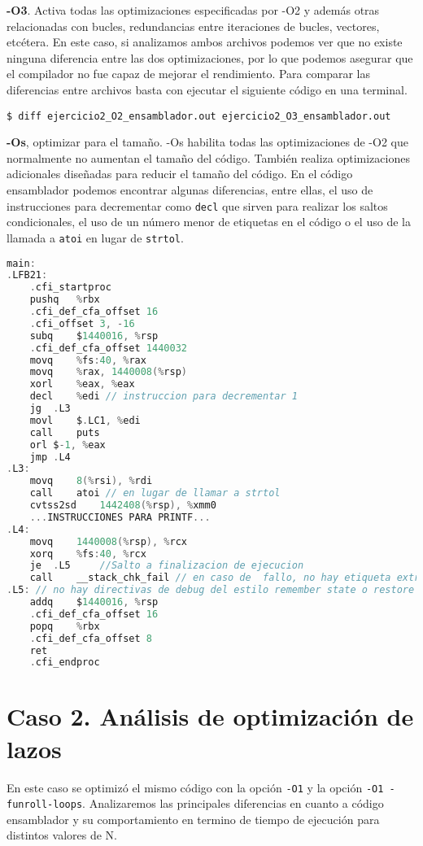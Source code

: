 \documentclass[10pt,a4paper]{article}
\begin{document}
\textbf{-O3}. Activa todas las optimizaciones especificadas por -O2 y además otras relacionadas con bucles, redundancias entre iteraciones de bucles, vectores, etcétera. En este caso, si analizamos ambos archivos podemos ver que no existe ninguna diferencia entre las dos optimizaciones, por lo que podemos asegurar que el compilador no fue capaz de mejorar el rendimiento. 
Para comparar las diferencias entre archivos basta con ejecutar el siguiente código en una terminal. 
\begin{lstlisting}[style=consola, numbers=none]
$ diff ejercicio2_O2_ensamblador.out ejercicio2_O3_ensamblador.out 
\end{lstlisting}
\textbf{-Os}, optimizar para el tamaño. -Os habilita todas las optimizaciones de -O2 que normalmente no aumentan el tamaño del código. También realiza optimizaciones adicionales diseñadas para reducir el tamaño del código. En el código ensamblador podemos encontrar algunas diferencias, entre ellas, el uso de instrucciones para decrementar como \texttt{decl} que sirven para realizar los saltos condicionales, el uso de un número menor de etiquetas en el código o el uso de la llamada a \texttt{atoi} en lugar de \texttt{strtol}.

\begin{lstlisting}[language=C]
main:
.LFB21:
	.cfi_startproc
	pushq	%rbx
	.cfi_def_cfa_offset 16
	.cfi_offset 3, -16
	subq	$1440016, %rsp
	.cfi_def_cfa_offset 1440032
	movq	%fs:40, %rax
	movq	%rax, 1440008(%rsp)
	xorl	%eax, %eax
	decl	%edi // instruccion para decrementar 1
	jg	.L3
	movl	$.LC1, %edi
	call	puts
	orl	$-1, %eax
	jmp	.L4
.L3:	
	movq	8(%rsi), %rdi
	call	atoi // en lugar de llamar a strtol 
	cvtss2sd	1442408(%rsp), %xmm0 
	...INSTRUCCIONES PARA PRINTF...
.L4:
	movq	1440008(%rsp), %rcx
	xorq	%fs:40, %rcx
	je	.L5		//Salto a finalizacion de ejecucion 
	call	__stack_chk_fail // en caso de  fallo, no hay etiqueta extra
.L5: // no hay directivas de debug del estilo remember state o restore state 
	addq	$1440016, %rsp
	.cfi_def_cfa_offset 16
	popq	%rbx
	.cfi_def_cfa_offset 8
	ret
	.cfi_endproc
\end{lstlisting}
	
\section{Caso 2. Análisis de optimización de lazos}
En este caso se optimizó el mismo código con la opción \texttt{-O1} y la opción \texttt{-O1 -funroll-loops}. Analizaremos las principales diferencias en cuanto a código ensamblador y su comportamiento en termino de tiempo de ejecución para distintos valores de N. 
\end{document}
